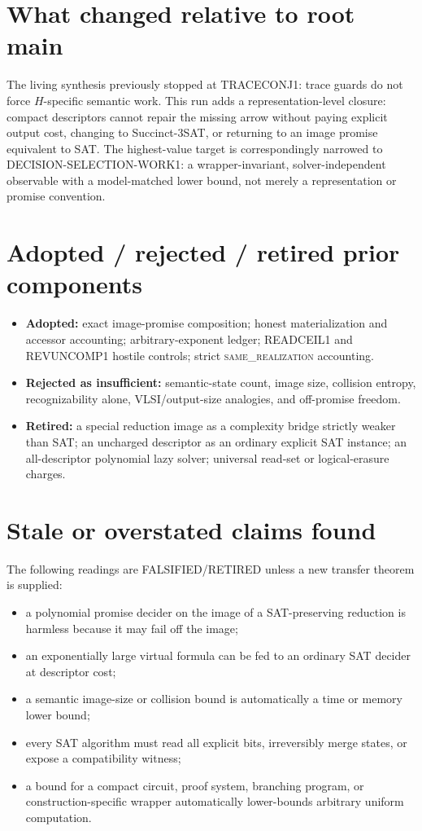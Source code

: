 \documentclass[11pt]{article}
\newcommand{\RET}{\textsf{FALSIFIED/RETIRED}}
\newcommand{\same}{\textnormal{\textsc{same\_realization}}}
\begin{document}
\section*{What changed relative to root main}
The living synthesis previously stopped at TRACECONJ1: trace guards do not
force $H$-specific semantic work.  This run adds a representation-level
closure: compact descriptors cannot repair the missing arrow without paying
explicit output cost, changing to Succinct-3SAT, or returning to an image
promise equivalent to SAT.  The highest-value target is correspondingly
narrowed to \textsf{DECISION-SELECTION-WORK1}: a wrapper-invariant,
solver-independent observable with a model-matched lower bound, not merely a
representation or promise convention.

\section*{Adopted / rejected / retired prior components}
\begin{itemize}
\item \textbf{Adopted:} exact image-promise composition; honest
materialization and accessor accounting; arbitrary-exponent ledger;
READCEIL1 and REVUNCOMP1 hostile controls; strict \same{} accounting.
\item \textbf{Rejected as insufficient:} semantic-state count, image size,
collision entropy, recognizability alone, VLSI/output-size analogies, and
off-promise freedom.
\item \textbf{Retired:} a special reduction image as a complexity bridge
strictly weaker than SAT; an uncharged descriptor as an ordinary explicit SAT
instance; an all-descriptor polynomial lazy solver; universal read-set or
logical-erasure charges.
\end{itemize}

\section*{Stale or overstated claims found}
The following readings are \RET{} unless a new transfer theorem is supplied:
\begin{itemize}
\item a polynomial promise decider on the image of a SAT-preserving reduction
is harmless because it may fail off the image;
\item an exponentially large virtual formula can be fed to an ordinary SAT
decider at descriptor cost;
\item a semantic image-size or collision bound is automatically a time or
memory lower bound;
\item every SAT algorithm must read all explicit bits, irreversibly merge
states, or expose a compatibility witness;
\item a bound for a compact circuit, proof system, branching program, or
construction-specific wrapper automatically lower-bounds arbitrary uniform
computation.
\end{itemize}
\end{document}
